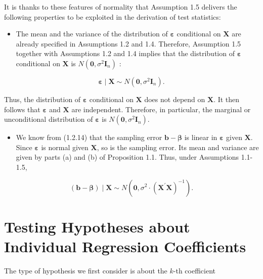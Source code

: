 \documentclass[10pt]{article}
\begin{document}
It is thanks to these features of normality that Assumption 1.5 delivers the following properties to be exploited in the derivation of test statistics:

\begin{itemize}
  \item The mean and the variance of the distribution of $\boldsymbol{\varepsilon}$ conditional on $\mathbf{X}$ are already specified in Assumptions 1.2 and 1.4. Therefore, Assumption 1.5 together with Assumptions 1.2 and 1.4 implies that the distribution of $\boldsymbol{\varepsilon}$ conditional on $\mathbf{X}$ is $N\left(\mathbf{0}, \sigma^{2} \mathbf{I}_{n}\right)$ :
\end{itemize}


\begin{equation*}
\boldsymbol{\varepsilon} \mid \mathbf{X} \sim N\left(\mathbf{0}, \sigma^{2} \mathbf{I}_{n}\right) . \tag{1.4.1}
\end{equation*}


Thus, the distribution of $\boldsymbol{\varepsilon}$ conditional on $\mathbf{X}$ does not depend on $\mathbf{X}$. It then follows that $\boldsymbol{\varepsilon}$ and $\mathbf{X}$ are independent. Therefore, in particular, the marginal or unconditional distribution of $\boldsymbol{\varepsilon}$ is $N\left(\mathbf{0}, \sigma^{2} \mathbf{I}_{n}\right)$.

\begin{itemize}
  \item We know from (1.2.14) that the sampling error $\mathbf{b}-\boldsymbol{\beta}$ is linear in $\boldsymbol{\varepsilon}$ given $\mathbf{X}$. Since $\boldsymbol{\varepsilon}$ is normal given $\mathbf{X}$, so is the sampling error. Its mean and variance are given by parts (a) and (b) of Proposition 1.1. Thus, under Assumptions 1.1-1.5,
\end{itemize}


\begin{equation*}
(\mathbf{b}-\boldsymbol{\beta}) \mid \mathbf{X} \sim N\left(\mathbf{0}, \sigma^{2} \cdot\left(\mathbf{X}^{\prime} \mathbf{X}\right)^{-1}\right) . \tag{1.4.2}
\end{equation*}


\section*{Testing Hypotheses about Individual Regression Coefficients}
The type of hypothesis we first consider is about the $k$-th coefficient
\end{document}

